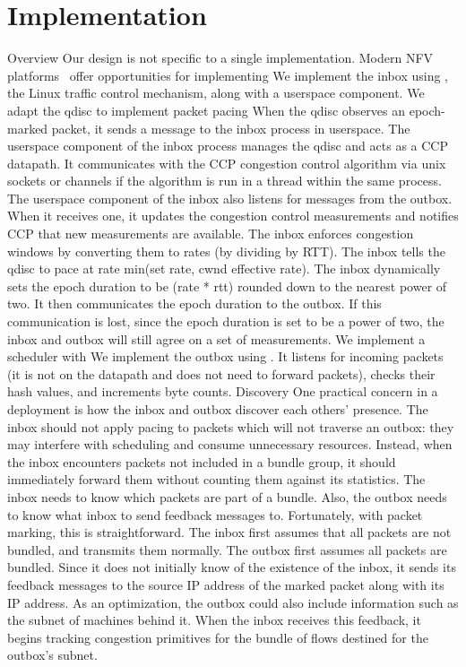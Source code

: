 \section{Implementation}\label{s:impl}
\begin{outline}
\1 Overview
\1 Our design is not specific to a single implementation.
    \2 Modern NFV platforms~\cite{bess, mos, netbricks} offer opportunities for implementing \name
    \2 We implement the inbox using , the Linux traffic control mechanism, along with a userspace component. We adapt the  qdisc to implement packet pacing
        \3 When the qdisc observes an epoch-marked packet, it sends a message to the inbox process in userspace.
        \3 The userspace component of the inbox process manages the qdisc and acts as a CCP datapath. It communicates with the CCP congestion control algorithm via unix sockets or channels if the algorithm is run in a thread within the same process.
        \3 The userspace component of the inbox also listens for messages from the outbox. When it receives one, it updates the congestion control measurements and notifies CCP that new measurements are available.
        \3 The inbox enforces congestion windows by converting them to rates (by dividing by RTT). The inbox tells the qdisc to pace at rate min(set rate, cwnd effective rate).
        \3 The inbox dynamically sets the epoch duration to be (rate * rtt) rounded down to the nearest power of two. It then communicates the epoch duration to the outbox.
            \4 If this communication is lost, since the epoch duration is set to be a power of two, the inbox and outbox will still agree on a set of measurements.
    \2 We implement a scheduler with 
    \2 We implement the outbox using .
        \3 It listens for incoming packets (it is not on the datapath and does not need to forward packets), checks their hash values, and increments byte counts.
\1 Discovery 
    \2 One practical concern in a \name deployment is how the inbox and outbox discover each others' presence.
    \2 The inbox should not apply pacing to packets which will not traverse an outbox: they may interfere with scheduling and consume unnecessary resources.
        \3 Instead, when the inbox encounters packets not included in a bundle group, it should immediately forward them without counting them against its statistics.
        \3 The inbox needs to know which packets are part of a bundle.
    \2 Also, the outbox needs to know what inbox to send feedback messages to.
    \2 Fortunately, with packet marking, this is straightforward. The inbox first assumes that all packets are not bundled, and transmits them normally.
    \2 The outbox first assumes all packets are bundled. Since it does not initially know of the existence of the inbox, it sends its feedback messages to the source IP address of the marked packet along with its IP address. As an optimization, the outbox could also include information such as the subnet of machines behind it.
        \3 When the inbox receives this feedback, it begins tracking congestion primitives for the bundle of flows destined for the outbox's subnet.
\end{outline}
